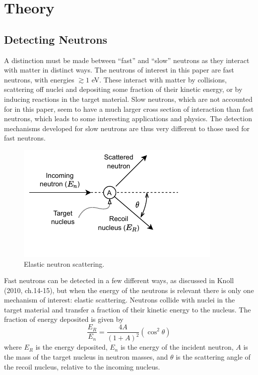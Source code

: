 \documentclass[11pt]{article}
\numberwithin{equation}{section}
\numberwithin{figure}{section}
\numberwithin{table}{section}
\begin{document}
\section{Theory}\label{sec:Theory}
\subsection{Detecting Neutrons}
\par A distinction must be made between ``fast'' and ``slow'' neutrons as they interact with matter in distinct ways. The neutrons of interest in this paper are fast neutrons, with energies $\gtrsim1$ eV. These interact with matter by collisions, scattering off nuclei and depositing some fraction of their kinetic energy, or by inducing reactions in the target material. Slow neutrons, which are not accounted for in this paper, seem to have a much larger cross section of interaction than fast neutrons, which leads to some interesting applications and physics. The detection mechanisms developed for slow neutrons are thus very different to those used for fast neutrons. \cite{Knoll}
\begin{figure}
    \includegraphics{Plots/neutronScattering.pdf}
    \caption{Elastic neutron scattering.}
    \label{fig:neutron scattering diagram}
\end{figure}
\par Fast neutrons can be detected in a few different ways, as discussed in Knoll (2010, ch.14-15), but when the energy of the neutrons is relevant there is only one mechanism of interest: elastic scattering. Neutrons collide with nuclei in the target material and transfer a fraction of their kinetic energy to the nucleus. The fraction of energy deposited is given by
\begin{equation}
    \frac{E_R}{E_n}=\frac{4A}{(1+A)^2}(\cos^2\theta)
    \label{eqn:Neutron scattering fraction}
\end{equation}
where $E_R$ is the energy deposited, $E_n$ is the energy of the incident neutron, $A$ is the mass of the target nucleus in neutron masses, and $\theta$ is the scattering angle of the recoil nucleus, relative to the incoming nucleus.
\end{document}
